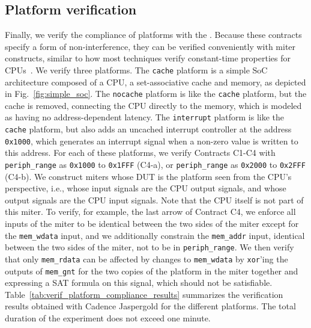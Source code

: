 \subsection{Platform verification}
\label{subsec:pici_platform_verif}

Finally, we verify the compliance of platforms with the \pic.
Because these contracts specify a form of non-interference, they can be verified conveniently with miter constructs, similar to how most techniques verify constant-time properties for CPUs~\cite{dinesh2024conjunct,dinesh2025h,wang2023specification,tan2025contractshadowlogic}.
We verify three platforms.
The \texttt{cache} platform is a simple SoC architecture composed of a CPU, a set-associative cache and memory, as depicted in Fig.~\ref{fig:simple_soc}.
The \texttt{nocache} platform is like the \texttt{cache} platform, but the cache is removed, connecting the CPU directly to the memory, which is modeled as having no address-dependent latency.
The \texttt{interrupt} platform is like the \texttt{cache} platform, but also adds an uncached interrupt controller at the address \texttt{0x1000}, which generates an interrupt signal when a non-zero value is written to this address.
For each of these platforms, we verify Contracts C1-C4 with \texttt{periph\_range} as \texttt{0x1000} to \texttt{0x1FFF} (C4-a), or \texttt{periph\_range} as \texttt{0x2000} to \texttt{0x2FFF} (C4-b).
We construct miters whose DUT is the platform seen from the CPU's perspective, i.e., whose input signals are the CPU output signals, and whose output signals are the CPU input signals.
Note that the CPU itself is not part of this miter.
To verify, for example, the last arrow of Contract C4, we enforce all inputs of the miter to be identical between the two sides of the miter except for the \texttt{mem\_wdata} input, and we additionally constrain the \texttt{mem\_addr} input, identical between the two sides of the miter, not to be in \texttt{periph\_range}.
We then verify that only \texttt{mem\_rdata} can be affected by changes to \texttt{mem\_wdata} by \texttt{xor}'ing the outputs of \texttt{mem\_gnt} for the two copies of the platform in the miter together and expressing a SAT formula on this signal, which should not be satisfiable.
Table~\ref{tab:verif_platform_compliance_results} summarizes the verification results obtained with Cadence Jaspergold for the different platforms.
The total duration of the experiment does not exceed one minute.
